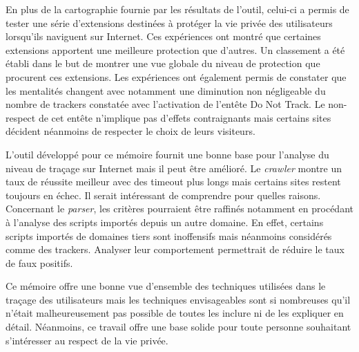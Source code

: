En plus de la cartographie fournie par les résultats de l'outil, celui-ci a permis de tester une série d'extensions destinées à protéger la vie privée des utilisateurs lorsqu'ils naviguent sur Internet. Ces expériences ont montré que certaines extensions apportent une meilleure protection que d'autres. Un classement a été établi dans le but de montrer une vue globale du niveau de protection que procurent ces extensions. Les expériences ont également permis de constater que les mentalités changent avec notamment une diminution non négligeable du nombre de trackers constatée avec l'activation de l'entête Do Not Track. Le non-respect de cet entête n'implique pas d'effets contraignants mais certains sites décident néanmoins de respecter le choix de leurs visiteurs.
\newline

L'outil développé pour ce mémoire fournit une bonne base pour l'analyse du niveau de traçage sur Internet mais il peut être amélioré. Le \textit{crawler} montre un taux de réussite meilleur avec des timeout plus longs mais certains sites restent toujours en échec. Il serait intéressant de comprendre pour quelles raisons. Concernant le \textit{parser}, les critères pourraient être raffinés notamment en procédant à l'analyse des scripts importés depuis un autre domaine. En effet, certains scripts importés de domaines tiers sont inoffensifs mais néanmoins considérés comme des trackers. Analyser leur comportement permettrait de réduire le taux de faux positifs.
\newline

Ce mémoire offre une bonne vue d'ensemble des techniques utilisées dans le traçage des utilisateurs mais les techniques envisageables sont si nombreuses qu'il n'était malheureusement pas possible de toutes les inclure ni de les expliquer en détail. Néanmoins, ce travail offre une base solide pour toute personne souhaitant s'intéresser au respect de la vie privée.
